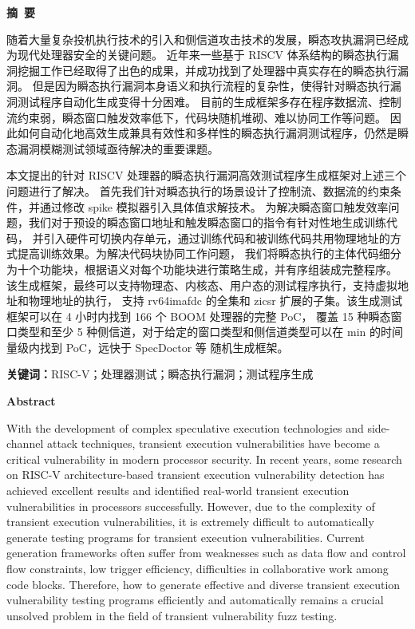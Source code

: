 \cleardoublepage{}
\begin{center}
    \bfseries {} 摘~要
\end{center}

随着大量复杂投机执行技术的引入和侧信道攻击技术的发展，瞬态攻执漏洞已经成为现代处理器安全的关键问题。
近年来一些基于 RISCV 体系结构的瞬态执行漏洞挖掘工作已经取得了出色的成果，并成功找到了处理器中真实存在的瞬态执行漏洞。
但是因为瞬态执行漏洞本身语义和执行流程的复杂性，使得针对瞬态执行漏洞测试程序自动化生成变得十分困难。
目前的生成框架多存在程序数据流、控制流约束弱，瞬态窗口触发效率低下，代码块随机堆砌、难以协同工作等问题。
因此如何自动化地高效生成兼具有效性和多样性的瞬态执行漏洞测试程序，仍然是瞬态漏洞模糊测试领域亟待解决的重要课题。\par

本文提出的针对 RISCV 处理器的瞬态执行漏洞高效测试程序生成框架对上述三个问题进行了解决。
首先我们针对瞬态执行的场景设计了控制流、数据流的约束条件，并通过修改 spike 模拟器引入具体值求解技术。
为解决瞬态窗口触发效率问题，我们对于预设的瞬态窗口地址和触发瞬态窗口的指令有针对性地生成训练代码，
并引入硬件可切换内存单元，通过训练代码和被训练代码共用物理地址的方式提高训练效果。为解决代码块协同工作问题，
我们将瞬态执行的主体代码细分为十个功能块，根据语义对每个功能块进行策略生成，并有序组装成完整程序。
该生成框架，最终可以支持物理态、内核态、用户态的测试程序执行，支持虚拟地址和物理地址的执行，
支持 rv64imafdc 的全集和 zicsr 扩展的子集。该生成测试框架可以在 4 小时内找到 166 个 BOOM 处理器的完整 PoC，
覆盖 15 种瞬态窗口类型和至少 5 种侧信道，对于给定的窗口类型和侧信道类型可以在 min 的时间量级内找到 PoC，远快于 SpecDoctor 等
随机生成框架。\par

\textbf{关键词：}RISC-V；处理器测试；瞬态执行漏洞；测试程序生成


\cleardoublepage{}
\begin{center}
    \bfseries {} Abstract
\end{center}

With the development of complex speculative execution technologies 
and side-channel attack techniques, transient execution vulnerabilities have become a critical vulnerability
in modern processor security. In recent years, 
some research on RISC-V architecture-based transient execution vulnerability detection 
has achieved excellent results and identified real-world transient execution vulnerabilities in processors successfully.
However, due to the complexity of transient execution vulnerabilities, 
it is extremely difficult to automatically generate testing programs for transient execution vulnerabilities.
Current generation frameworks often suffer from weaknesses 
such as data flow and control flow constraints, 
low trigger efficiency, difficulties in collaborative work among code blocks. 
Therefore, how to generate effective and diverse transient execution vulnerability testing programs  efficiently and automatically 
remains a crucial unsolved problem in the field of transient vulnerability fuzz testing.\par

